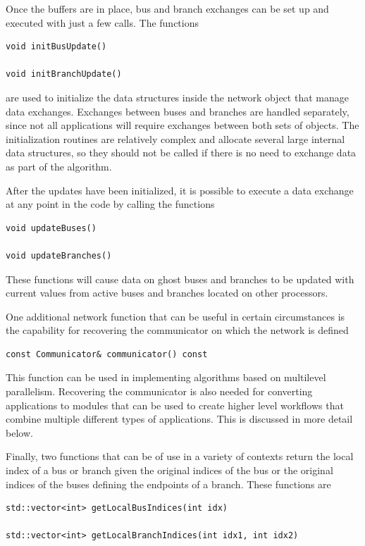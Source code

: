 Once the buffers are in place, bus and branch exchanges can be set up and executed with just a few calls. The functions

{
\color{red}
\begin{Verbatim}[fontseries=b]
void initBusUpdate()

void initBranchUpdate()
\end{Verbatim}
}

are used to initialize the data structures inside the network object that manage data exchanges. Exchanges between buses and branches are handled separately, since not all applications will require exchanges between both sets of objects. The initialization routines are relatively complex and allocate several large internal data structures, so they should not be called if there is no need to exchange data as part of the algorithm.

After the updates have been initialized, it is possible to execute a data exchange at any point in the code by calling the functions

{
\color{red}
\begin{Verbatim}[fontseries=b]
void updateBuses()

void updateBranches()
\end{Verbatim}
}

These functions will cause data on ghost buses and branches to be updated with current values from active buses and branches located on other processors.

One additional network function that can be useful in certain circumstances is the capability for recovering the communicator on which the network is defined

{
\color{red}
\begin{Verbatim}[fontseries=b]
const Communicator& communicator() const
\end{Verbatim}
}

This function can be used in implementing algorithms based on multilevel parallelism. Recovering the communicator is also needed for converting applications to modules that can be used to create higher level workflows that combine multiple different types of applications. This is discussed in more detail below.

Finally, two functions that can be of use in a variety of contexts return the
local index of a bus or branch given the original indices of the bus or the
original indices of the buses defining the endpoints of a branch. These
functions are

{
\color{red}
\begin{Verbatim}[fontseries=b]
std::vector<int> getLocalBusIndices(int idx)

std::vector<int> getLocalBranchIndices(int idx1, int idx2)
\end{Verbatim}
}

